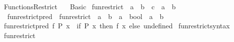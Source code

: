 %
\begin{isabellebody}%
%
%
\isadelimtheory
%
\endisadelimtheory
%
\isatagtheory
\isanewline
{}\isamarkupfalse%
\ Functions{\isacharunderscore}{\kern0pt}Restrict\isanewline
\ \ \ Basic\isanewline
{}%
\endisatagtheory
{\isafoldtheory}%
%
\isadelimtheory
\isanewline
%
\endisadelimtheory
\isanewline
{}\isamarkupfalse%
\ fun{\isacharunderscore}{\kern0pt}restrict\ {\isacharcolon}{\kern0pt}{\isacharcolon}{\kern0pt}\ {\isachardoublequoteopen}{\isacharparenleft}{\kern0pt}{\isacharprime}{\kern0pt}a\ {\isasymRightarrow}\ {\isacharprime}{\kern0pt}b{\isacharparenright}{\kern0pt}\ {\isasymRightarrow}\ {\isacharprime}{\kern0pt}c\ {\isasymRightarrow}\ {\isacharprime}{\kern0pt}a\ {\isasymRightarrow}\ {\isacharprime}{\kern0pt}b{\isachardoublequoteclose}\isanewline
\isanewline
{}\isamarkupfalse%
\isanewline
\ \ fun{\isacharunderscore}{\kern0pt}restrict{\isacharunderscore}{\kern0pt}pred\ {\isasymequiv}\ {\isachardoublequoteopen}fun{\isacharunderscore}{\kern0pt}restrict\ {\isacharcolon}{\kern0pt}{\isacharcolon}{\kern0pt}\ {\isacharparenleft}{\kern0pt}{\isacharprime}{\kern0pt}a\ {\isasymRightarrow}\ {\isacharprime}{\kern0pt}b{\isacharparenright}{\kern0pt}\ {\isasymRightarrow}\ {\isacharparenleft}{\kern0pt}{\isacharprime}{\kern0pt}a\ {\isasymRightarrow}\ bool{\isacharparenright}{\kern0pt}\ {\isasymRightarrow}\ {\isacharprime}{\kern0pt}a\ {\isasymRightarrow}\ {\isacharprime}{\kern0pt}b{\isachardoublequoteclose}\isanewline
{}\isanewline
\ \ \isamarkupfalse%
\ {\isachardoublequoteopen}fun{\isacharunderscore}{\kern0pt}restrict{\isacharunderscore}{\kern0pt}pred\ f\ P\ x\ {\isasymequiv}\ if\ P\ x\ then\ f\ x\ else\ undefined{\isachardoublequoteclose}\isanewline
{}\isamarkupfalse%
\isanewline
\isanewline
{}\isamarkupfalse%
\ fun{\isacharunderscore}{\kern0pt}restrict{\isacharunderscore}{\kern0pt}syntax\isanewline
{}\isanewline
{}\isamarkupfalse%
\ fun{\isacharunderscore}{\kern0pt}restrict\ {\isacharparenleft}{\kern0pt}{\isachardoublequoteopen}{\isacharparenleft}{\kern0pt}{\isacharunderscore}{\kern0pt}{\isacharparenright}{\kern0pt}{\isasymrestriction}{\isacharparenleft}{\kern0pt}\isactrlbsub {\isacharunderscore}{\kern0pt}\isactrlesub {\isacharparenright}{\kern0pt}{\isachardoublequoteclose}\ {\isacharbrackleft}{\kern0pt}{}{}{}{}{\isacharbrackright}{\kern0pt}{\isacharparenright}{\kern0pt}\isanewline

\end{isabellebody}
